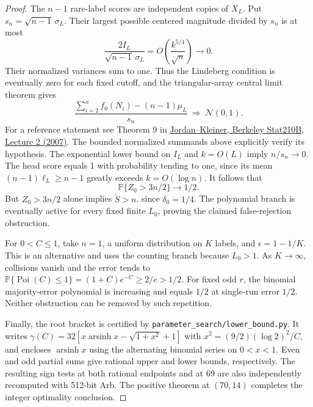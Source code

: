 \documentclass[10pt]{article}
\newcommand{\Prb}{\mathbb P}
\begin{document}
\begin{proof}
The $n-1$ rare-label scores are independent copies of $X_L$. Put
$s_n=\sqrt{n-1}\,\sigma_L$. Their largest possible centered magnitude
divided by $s_n$ is at most
\[
 \frac{2I_L}{\sqrt{n-1}\,\sigma_L}
       =O\left(\frac{k^{5/4}}{\sqrt n}\right)\longrightarrow0.
\]
Their normalized variances sum to one. Thus the Lindeberg condition is
eventually zero for each fixed cutoff, and the triangular-array central
limit theorem gives
\[
 \frac{\sum_{i=2}^n f_0(N_i)-(n-1)\mu_L}{s_n}
       \ \Longrightarrow\ \mathcal N(0,1).
\]
For a reference statement see Theorem 9 in
\href{https://people.eecs.berkeley.edu/~jordan/courses/210B-spring07/lectures/stat210b_lecture_2.pdf}
{Jordan--Kleiner, Berkeley Stat210B, Lecture 2 (2007)}.
The bounded normalized summands above explicitly verify its hypothesis.
The exponential lower bound on $I_L$ and $k=O(L)$ imply $n/s_n\to0$.
The head score equals 1 with probability tending to one, since its mean
$(n-1)\ell_L\ge n-1$ greatly exceeds $k=O(\log n)$.
It follows that
\[
 \Prb\{Z_0>3n/2\}\longrightarrow1/2.
\]
But $Z_0>3n/2$ alone implies $\widetilde S>n$, since $\delta_0=1/4$.
The polynomial branch is eventually active for every fixed finite $L_0$,
proving the claimed false-rejection obstruction.

For $0<C\le1$, take $n=1$, a uniform distribution on $K$ labels, and
$\epsilon=1-1/K$. This is an alternative and uses the counting branch
because $L_0>1$. As $K\to\infty$, collisions vanish and the error tends to
$\Prb\{\operatorname{Poi}(C)\le1\}=(1+C)e^{-C}\ge2/e>1/2$.
For fixed odd $r$, the binomial majority-error polynomial is increasing
and equals $1/2$ at single-run error $1/2$. Neither obstruction can be
removed by such repetition.

Finally, the root bracket is certified by
\texttt{parameter\_search/lower\_bound.py}. It writes
$\gamma(C)=32[x\operatorname{arsinh}x-\sqrt{1+x^2}+1]$ with
$x^2=(9/2)(\log2)^2/C$, and encloses $\operatorname{arsinh}x$ using the
alternating binomial series on $0<x<1$. Even and odd partial sums give
rational upper and lower bounds, respectively. The resulting sign tests
at both rational endpoints and at 69 are also independently recomputed
with 512-bit Arb. The positive theorem at $(70,14)$ completes the integer
optimality conclusion.
\end{proof}
\end{document}
